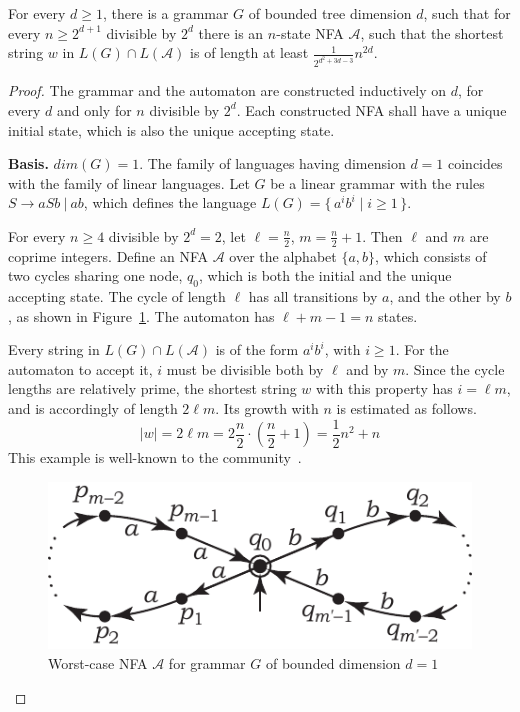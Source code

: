 \documentclass[runningheads]{llncs}
\newcommand{\set}[2]{\{ \, #1 \mid #2 \, \}}
\begin{document}
\begin{lemma}\label{lowerlemma}
For every $d \geqslant 1$,
there is a grammar $G$ of bounded tree dimension $d$,
such that for every $n \geqslant 2^{d+1}$ divisible by $2^d$
there is an $n$-state NFA $\mathcal{A}$,
such that the shortest string $w$ in $L(G) \cap L(\mathcal{A})$
is of length at least $\frac{1}{2^{d^2 + 3d - 3}} n^{2d}$.
\end{lemma}
\begin{proof}
The grammar and the automaton are constructed inductively on $d$,
for every $d$ and only for $n$ divisible by $2^d$.
Each constructed NFA shall have a unique initial state,
which is also the unique accepting state.

\textbf{Basis.} $dim(G) = 1$.
The family of languages having dimension $d = 1$
coincides with the family of linear languages.
Let $G$ be a linear grammar with the rules $S \to aSb \ | \ ab$,
which defines the language $L(G) = \set{a^i b^i}{i \geqslant 1}$. 

For every $n \geqslant 4$ divisible by $2^d=2$,
let $\ell = \frac{n}{2}$, $m=\frac{n}{2} + 1$.
Then $\ell$ and $m$ are coprime integers.
Define an NFA $\mathcal{A}$ over the alphabet $\{a, b\}$,
which consists of two cycles
sharing one node, $q_0$,
which is both the initial and the unique accepting state.
The cycle of length $\ell$ has all transitions by $a$, and the other by $b$,
as shown in Figure~\ref{worstd_1}.
The automaton has $\ell+m-1=n$ states.

Every string in $L(G) \cap L(\mathcal{A})$
is of the form $a^i b^i$, with $i \geqslant 1$.
For the automaton to accept it,
$i$ must be divisible both by $\ell$ and by $m$.
Since the cycle lengths are relatively prime,
the shortest string $w$ with this property has $i=\ell m$,
and is accordingly of length $2\ell m$.
Its growth with $n$ is estimated as follows.
\begin{equation*}
	|w|
		=
	2\ell m
		=
	2 \frac{n}{2} \cdot (\frac{n}{2} + 1)
		=
	\frac{1}{2} n^2 + n
\end{equation*}
This example is well-known to the community~\cite{HellingsCFPQ,Yannakakis}. 

\begin{figure}[t]
\centering
\includegraphics[scale=0.9]{pictures/rational_index_A1.pdf}
\caption{Worst-case NFA $\mathcal{A}$ for grammar $G$ of bounded dimension $d=1$}
\label{worstd_1}
\end{figure}


\end{proof}
\end{document}
